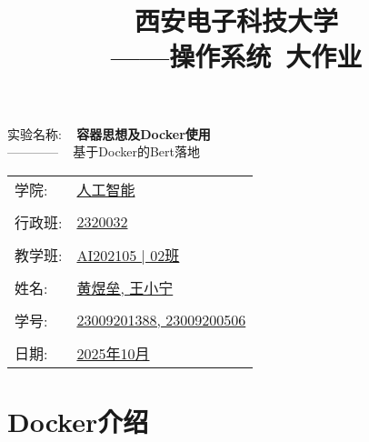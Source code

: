 \documentclass[UTF8]{ctexart}
\title{
    \Huge \textbf{西安电子科技大学} \\
    \vspace{0.5cm} 
    ——\LARGE 操作系统~大作业
}
\author{}
\date{}
\begin{document}


\maketitle

\begin{center}
    \Huge 实验名称: ~ \textbf{容器思想及Docker使用}
    \\
    \Large ———— ~ 基于Docker的Bert落地
\end{center}

\vspace{1cm}

\begin{center}
    \Large
    \begin{tabular}{ll}
        学院: & \underline{人工智能}\\
        & \\
        行政班: & \underline{2320032}\\
        & \\
        教学班: & \underline{AI202105 | 02班}\\
        & \\
        姓名: & \underline{黄煜垒, 王小宁}\\
        & \\
        学号: & \underline{23009201388, 23009200506}\\
        & \\
        日期: & \underline{2025年10月}\\
    \end{tabular}
\end{center}

\newpage %

\tableofcontents %

\newpage %

\section{Docker介绍} %
\end{document}
